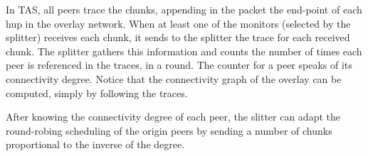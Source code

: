 In TAS, all peers trace the chunks, appending in the packet the
end-point of each hup in the overlay network. When at least one of the
monitors (selected by the splitter) receives each chunk, it sends to
the splitter the trace for each received chunk. The splitter gathers
this information and counts the number of times each peer is
referenced in the traces, in a round. The counter for a peer speaks of
its connectivity degree. Notice that the connectivity graph of the
overlay can be computed, simply by following the traces.

After knowing the connectivity degree of each peer, the slitter can
adapt the round-robing scheduling of the origin peers by sending a
number of chunks proportional to the inverse of the degree.
